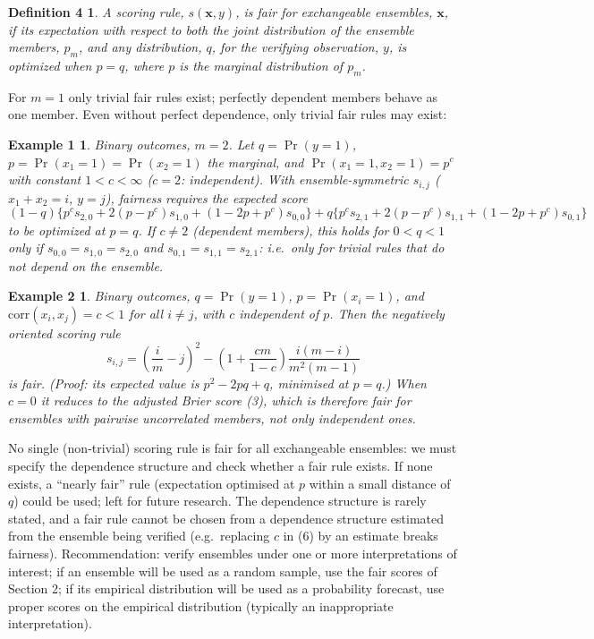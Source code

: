 \documentclass{article}
\newtheorem*{definition4}{Definition 4}
\newtheorem*{example1}{Example 1}
\newtheorem*{example2}{Example 2}
\newcommand{\bx}{\mathbf{x}}
\begin{document}
\begin{definition4}
A scoring rule, $s(\bx,y)$, is \emph{fair for exchangeable ensembles}, $\bx$,
if its expectation with respect to both the joint distribution of the ensemble
members, $p_m$, and any distribution, $q$, for the verifying observation, $y$,
is optimized when $p=q$, where $p$ is the marginal distribution of $p_m$.
\end{definition4}

For $m=1$ only trivial fair rules exist; perfectly dependent members behave as
one member. Even without perfect dependence, only trivial fair rules may exist:

\begin{example1}
Binary outcomes, $m=2$. Let $q=\Pr(y=1)$, $p=\Pr(x_1=1)=\Pr(x_2=1)$ the
marginal, and $\Pr(x_1=1,x_2=1)=p^c$ with constant $1<c<\infty$ ($c=2$:
independent). With ensemble-symmetric $s_{i,j}$ ($x_1+x_2=i$, $y=j$), fairness
requires the expected score
\[
  (1-q)\{p^c s_{2,0}+2(p-p^c)s_{1,0}+(1-2p+p^c)s_{0,0}\}
  + q\{p^c s_{2,1}+2(p-p^c)s_{1,1}+(1-2p+p^c)s_{0,1}\}
\]
to be optimized at $p=q$. If $c\neq2$ (dependent members), this holds for
$0<q<1$ only if $s_{0,0}=s_{1,0}=s_{2,0}$ and $s_{0,1}=s_{1,1}=s_{2,1}$:
i.e.\ only for trivial rules that do not depend on the ensemble.
\end{example1}

\begin{example2}
Binary outcomes, $q=\Pr(y=1)$, $p=\Pr(x_i=1)$, and
$\mathrm{corr}(x_i,x_j)=c<1$ for all $i\neq j$, with $c$ independent of $p$.
Then the negatively oriented scoring rule
\begin{equation}\tag{6}
  s_{i,j} = \left(\frac{i}{m}-j\right)^2 - \left(1+\frac{cm}{1-c}\right)\frac{i(m-i)}{m^2(m-1)}
\end{equation}
is fair. (Proof: its expected value is $p^2-2pq+q$, minimised at $p=q$.) When
$c=0$ it reduces to the adjusted Brier score (3), which is therefore fair for
ensembles with pairwise \emph{uncorrelated} members, not only independent ones.
\end{example2}

No single (non-trivial) scoring rule is fair for all exchangeable ensembles: we
must specify the dependence structure and check whether a fair rule exists. If
none exists, a ``nearly fair'' rule (expectation optimised at $p$ within a small
distance of $q$) could be used; left for future research. The dependence
structure is rarely stated, and a fair rule cannot be chosen from a dependence
structure estimated from the ensemble being verified (e.g.\ replacing $c$ in
(6) by an estimate breaks fairness). Recommendation: verify ensembles under one
or more interpretations of interest; if an ensemble will be used as a random
sample, use the fair scores of Section 2; if its empirical distribution will be
used as a probability forecast, use proper scores on the empirical distribution
(typically an inappropriate interpretation).
\end{document}
